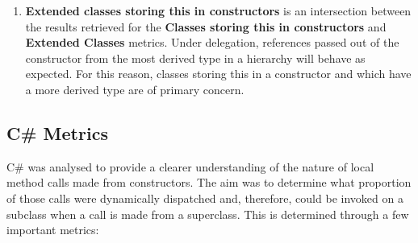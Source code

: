 \begin{enumerate}
	\item \textbf{Extended classes storing this in constructors} is an intersection between the results retrieved for the \textbf{Classes storing this in constructors} and \textbf{Extended Classes} metrics. Under delegation, references passed out of the constructor from the most derived type in a hierarchy will behave as expected. For this reason, classes storing this in a constructor and which have a more derived type are of primary concern.
\end{enumerate}

\subsection{C\# Metrics}
C\# was analysed to provide a clearer understanding of the nature of local method calls made from constructors. The aim was to determine what proportion of those calls were dynamically dispatched and, therefore, could be invoked on a subclass when a call is made from a superclass. This is determined through a few important metrics:
